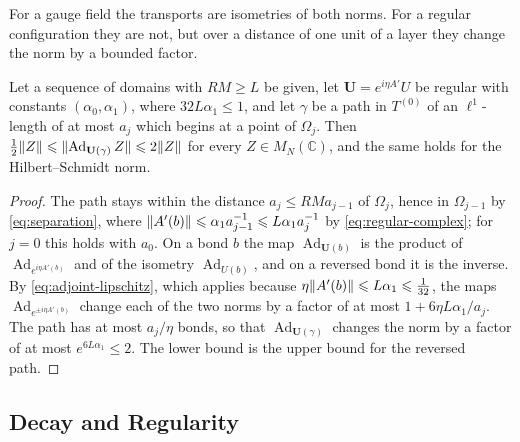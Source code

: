 \documentclass[11pt]{preprint}
\newcommand{\Ad}{\operatorname{Ad}}
\DeclarePairedDelimiter{\norm}{\lVert}{\rVert}
\numberwithin{equation}{section}
\begin{document}
For a gauge field the transports are isometries of both norms. For a regular configuration they are not, but over a distance of one unit of a layer they change the norm by a bounded factor.

\begin{lemma}\label{lem:transports}
Let a sequence of domains with $RM \geqslant L$ be given, let $\mathbf U = e^{i\eta A'}U$ be regular with constants $(\alpha_0, \alpha_1)$, where $32L\alpha_1 \leqslant 1$, and let $\gamma$ be a path in $T^{(0)}$ of an $\ell^1$-length of at most $a_j$ which begins at a point of $\Omega_j$. Then $\frac{1}{2}\norm Z \leqslant \norm{\Ad_{\mathbf U(\gamma)}Z} \leqslant 2\norm Z$ for every $Z \in M_N(\mathbb C)$, and the same holds for the Hilbert--Schmidt norm.
\end{lemma}

\begin{proof}
The path stays within the distance $a_j \leqslant RMa_{j-1}$ of $\Omega_j$, hence in $\Omega_{j-1}$ by \eqref{eq:separation}, where $\norm{A'(b)} \leqslant \alpha_1a_{j-1}^{-1} \leqslant L\alpha_1a_j^{-1}$ by \eqref{eq:regular-complex}; for $j = 0$ this holds with $a_0$. On a bond $b$ the map $\Ad_{\mathbf U(b)}$ is the product of $\Ad_{e^{i\eta A'(b)}}$ and of the isometry $\Ad_{U(b)}$, and on a reversed bond it is the inverse. By \eqref{eq:adjoint-lipschitz}, which applies because $\eta\norm{A'(b)} \leqslant L\alpha_1 \leqslant \frac{1}{32}$, the maps $\Ad_{e^{\pm i\eta A'(b)}}$ change each of the two norms by a factor of at most $1 + 6\eta L\alpha_1/a_j$. The path has at most $a_j/\eta$ bonds, so that $\Ad_{\mathbf U(\gamma)}$ changes the norm by a factor of at most $e^{6L\alpha_1} \leqslant 2$. The lower bound is the upper bound for the reversed path.
\end{proof}

\subsection{Decay and Regularity}\label{sec:propagator-bounds}
\end{document}
